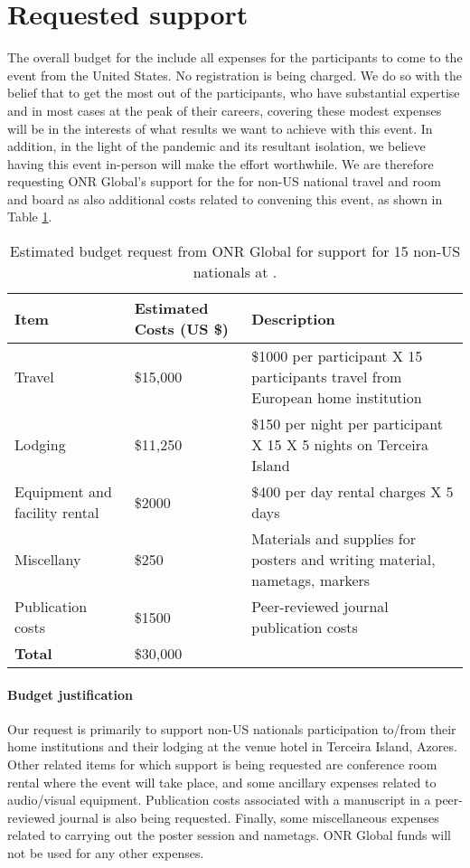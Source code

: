 \section{Requested  support}

The overall budget for the \symp include all expenses for the
participants to come to the event from the United States. No
registration is being charged. We do so with the belief that to get
the most out of the participants, who have substantial expertise and
in most cases at the peak of their careers, covering these modest
expenses will be in the interests of what results we want to achieve
with this event. In addition, in the light of the pandemic and its
resultant isolation, we believe having this event in-person will make
the effort worthwhile.  We are therefore requesting ONR Global's
support for the \symp for non-US national travel and room and board as
also additional costs related to convening this event, as shown in
Table \ref{tab:nsf-budget}.

\begin{table}[!h]
  \footnotesize{
    \centering    
    \begin{tabular}{|p{3.0cm}|p{1.6cm}|p{10cm}|}
      \hline 
      \rowcolor{Gray}
      \bfseries Item& \bfseries Estimated Costs (US \$)&\bfseries Description\\
      \hline
      Travel & \$15,000 & \$1000 per participant X 15 participants travel from European home institution \\
      \hline
      Lodging& \$11,250 & \$150 per night per participant X 15 X 5 nights on Terceira Island\\
      \hline
      Equipment and facility rental &\$2000 & \$400 per day rental charges X 5 days\\
      \hline
      Miscellany& \$250 & Materials and supplies for posters and writing material,
                          nametags, markers\\
      \hline
      Publication costs& \$1500 & Peer-reviewed journal publication
                                  costs\\
      \hline
      \textbf{Total}& \$30,000&\\
      \hline        
  \end{tabular}
  \caption{Estimated budget request from ONR Global for support for 15
    non-US nationals at \sympe.}
  \label{tab:nsf-budget}
}
\end{table}

\paragraph{Budget justification} Our request is primarily to support
non-US nationals participation to/from their home institutions and
their lodging at the venue hotel in Terceira Island, Azores. Other
related items for which support is being requested are conference room
rental where the event will take place, and some ancillary expenses
related to audio/visual equipment. Publication costs associated with a
manuscript in a peer-reviewed journal is also being
requested. Finally, some miscellaneous expenses related to carrying
out the poster session and nametags. ONR Global funds will not be used
for any other expenses.

